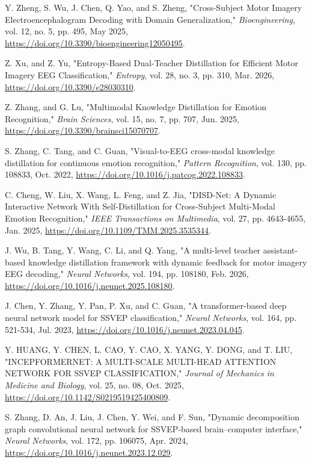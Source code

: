  Y. Zheng, S. Wu, J. Chen, Q. Yao, and S. Zheng, "Cross-Subject Motor Imagery Electroencephalogram Decoding with Domain Generalization," \textit{Bioengineering}, vol. 12, no. 5, pp. 495, May 2025, \url{https://doi.org/10.3390/bioengineering12050495}.

 Z. Xu, and Z. Yu, "Entropy-Based Dual-Teacher Distillation for Efficient Motor Imagery EEG Classification," \textit{Entropy}, vol. 28, no. 3, pp. 310, Mar. 2026, \url{https://doi.org/10.3390/e28030310}.

 Z. Zhang, and G. Lu, "Multimodal Knowledge Distillation for Emotion Recognition," \textit{Brain Sciences}, vol. 15, no. 7, pp. 707, Jun. 2025, \url{https://doi.org/10.3390/brainsci15070707}.

 S. Zhang, C. Tang, and C. Guan, "Visual-to-EEG cross-modal knowledge distillation for continuous emotion recognition," \textit{Pattern Recognition}, vol. 130, pp. 108833, Oct. 2022, \url{https://doi.org/10.1016/j.patcog.2022.108833}.

 C. Cheng, W. Liu, X. Wang, L. Feng, and Z. Jia, "DISD-Net: A Dynamic Interactive Network With Self-Distillation for Cross-Subject Multi-Modal Emotion Recognition," \textit{IEEE Transactions on Multimedia}, vol. 27, pp. 4643-4655, Jan. 2025, \url{https://doi.org/10.1109/TMM.2025.3535344}.

 J. Wu, B. Tang, Y. Wang, C. Li, and Q. Yang, "A multi-level teacher assistant-based knowledge distillation framework with dynamic feedback for motor imagery EEG decoding," \textit{Neural Networks}, vol. 194, pp. 108180, Feb. 2026, \url{https://doi.org/10.1016/j.neunet.2025.108180}.

 J. Chen, Y. Zhang, Y. Pan, P. Xu, and C. Guan, "A transformer-based deep neural network model for SSVEP classification," \textit{Neural Networks}, vol. 164, pp. 521-534, Jul. 2023, \url{https://doi.org/10.1016/j.neunet.2023.04.045}.

 Y. HUANG, Y. CHEN, L. CAO, Y. CAO, X. YANG, Y. DONG, and T. LIU, "INCEPFORMERNET: A MULTI-SCALE MULTI-HEAD ATTENTION NETWORK FOR SSVEP CLASSIFICATION," \textit{Journal of Mechanics in Medicine and Biology}, vol. 25, no. 08, Oct. 2025, \url{https://doi.org/10.1142/S0219519425400809}.

 S. Zhang, D. An, J. Liu, J. Chen, Y. Wei, and F. Sun, "Dynamic decomposition graph convolutional neural network for SSVEP-based brain–computer interface," \textit{Neural Networks}, vol. 172, pp. 106075, Apr. 2024, \url{https://doi.org/10.1016/j.neunet.2023.12.029}.

